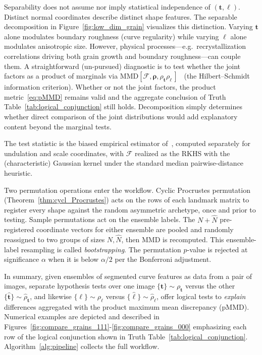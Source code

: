 \documentclass[pdflatex,iicol]{sn-jnl}%
\theoremstyle{thmstyleone}%
\theoremstyle{thmstyletwo}%
\theoremstyle{thmstylethree}%
\begin{document}
Separability does not assume nor imply statistical independence of $(\boldsymbol{t},\boldsymbol{\ell})$. Distinct normal coordinates describe distinct shape features. The separable decomposition in Figure~\ref{fig:low_dim_grain} visualizes this distinction. Varying $\boldsymbol{t}$ alone modulates boundary roughness (curve regularity) while varying $\boldsymbol{\ell}$ alone modulates anisotropic size. However, physical processes---e.g.\ recrystallization correlations driving both grain growth and boundary roughness---can couple them. A straightforward (un-pursued) diagnostic is to test whether the joint factors as a product of marginals via $\text{MMD}[\mathcal{F},\boldsymbol{\rho},\rho_{\boldsymbol{t}}\rho_{\boldsymbol{\ell}}\,]$~\cite{gretton2012kernel} (the Hilbert--Schmidt information criterion). Whether or not the joint factors, the product metric~\eqref{eq:pMMD} remains valid and the aggregate conclusion of Truth Table~\ref{tab:logical_conjunction} still holds. Decomposition simply determines whether direct comparison of the joint distributions would add explanatory content beyond the marginal tests.

The test statistic is the biased empirical estimator of~\cite{gretton2012kernel}, computed separately for undulation and scale coordinates, with $\mathcal{F}$ realized as the RKHS with the (characteristic) Gaussian kernel under the standard median pairwise-distance heuristic.

Two permutation operations enter the workflow. Cyclic Procrustes permutation (Theorem~\ref{thm:cycl_Procrustes}) acts on the rows of each landmark matrix to register every shape against the random asymmetric archetype, once and prior to testing. Sample permutations act on the ensemble labels. The $N+\widehat{N}$ pre-registered coordinate vectors for either ensemble are pooled and randomly reassigned to two groups of sizes $N,\widehat{N}$, then MMD is recomputed. This ensemble-label resampling is called \textit{bootstrapping}. The permutation $p$-value is rejected at significance $\alpha$ when it is below $\alpha/2$ per the Bonferroni adjustment.

In summary, given ensembles of segmented curve features as data from a pair of images, separate hypothesis tests over one image $\lbrace \boldsymbol{t} \rbrace \sim \rho_{\boldsymbol{t}}$ versus the other $\lbrace \widehat{\boldsymbol{t}}\rbrace \sim \widehat{\rho}_{\boldsymbol{t}}$, and likewise $\lbrace \boldsymbol{\ell} \rbrace \sim \rho_{\boldsymbol{\ell}}$ versus $\lbrace \widehat{\boldsymbol{\ell}}\rbrace \sim \widehat{\rho}_{\boldsymbol{\ell}}$, offer logical tests to \emph{explain} differences aggregated with the product maximum mean discrepancy (pMMD). Numerical examples are depicted and described in Figures~\ref{fig:compare_grains_111}-\ref{fig:compare_grains_000} emphasizing each row of the logical conjunction shown in Truth Table~\ref{tab:logical_conjunction}. Algorithm~\ref{alg:pipeline} collects the full workflow.
\end{document}
